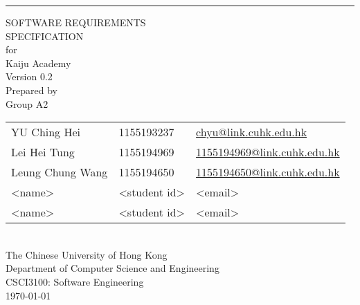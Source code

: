 \documentclass[a4paper, 11pt]{scrreprt}
\date{}
\def\myversion{0.2}
\def\projectname{Kaiju Academy}  %
\begin{document}

\begin{titlepage}
    \begin{flushright}
        \rule{\textwidth}{5pt}\vskip1cm
        \begin{bfseries}
            \Huge{SOFTWARE REQUIREMENTS\\ SPECIFICATION}\\
            \vspace{1.6cm}
            for\\
            \vspace{1.6cm}
            \projectname\\  %
            \vspace{1.6cm}
            \LARGE{Version \myversion}\\
            \vspace{1.6cm}
            Prepared by\\
            Group A2\\
            \begin{tabularx}{\textwidth}{X l X}
            YU Ching Hei & 1155193237 & \href{mailto:chyu@link.cuhk.edu.hk}{chyu@link.cuhk.edu.hk}\\
            Lei Hei Tung & 1155194969 & \href{mailto:1155194969@link.cuhk.edu.hk}{1155194969@link.cuhk.edu.hk}\\
            Leung Chung Wang & 1155194650 & \href{mailto:1155194650@link.cuhk.edu.hk}{1155194650@link.cuhk.edu.hk}\\
            <name> & <student id> & <email>\\
            <name> & <student id> & <email>\\
            \end{tabularx}\\
            \vspace{1.6cm}
            The Chinese University of Hong Kong\\
            Department of Computer Science and Engineering\\
            CSCI3100: Software Engineering\\
            \vspace{1.6cm}
            \today\\
        \end{bfseries}
    \end{flushright}
\end{titlepage}
\end{document}
